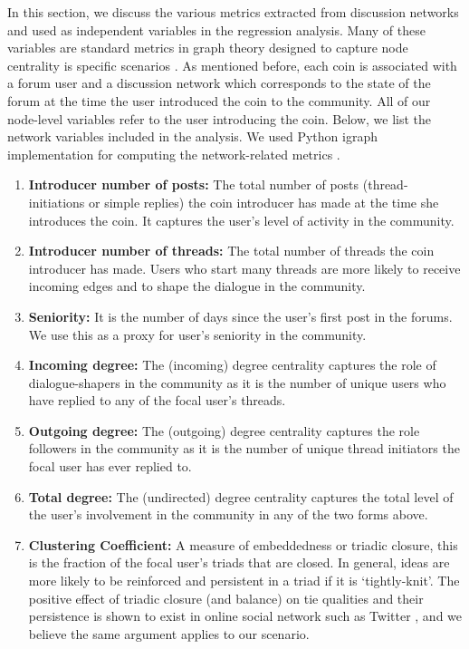 In this section, we discuss the various metrics extracted from discussion networks and used as independent variables in the regression analysis. Many of these variables are standard metrics in graph theory designed to capture node centrality is specific scenarios \cite{KleinbergNetworks}. As mentioned before, each coin is associated with a forum user and a discussion network which corresponds to the state of the forum at the time the user introduced the coin to the community. All of our node-level variables refer to the user introducing the coin. Below, we list the network variables included in the analysis. We used Python igraph implementation for computing the network-related metrics \cite{igraph}.
\begin{enumerate}[topsep=0pt,itemsep=-0.5ex,partopsep=1ex,parsep=1ex]
  \item \textbf{Introducer number of posts:} The total number of posts (thread-initiations or simple replies) the coin introducer has made at the time she introduces the coin. It captures the user's level of activity in the community.
  \item \textbf{Introducer number of threads:} The total number of threads the coin introducer has made. Users who start many threads are more likely to receive incoming edges and to shape the dialogue in the community.
  \item \textbf{Seniority:} It is the number of days since the user's first post in the forums. We use this as a proxy for user's seniority in the community.
  \item \textbf{Incoming degree:} The (incoming) degree centrality captures the role of dialogue-shapers in the community as it is the number of unique users who have replied to any of the focal user's threads.
  \item \textbf{Outgoing degree:} The (outgoing) degree centrality captures the role followers in the community as it is the number of unique thread initiators the focal user has ever replied to. 
  \item \textbf{Total degree:} The (undirected) degree centrality captures the total level of the user's involvement in the community in any of the two forms above.
  \item \textbf{Clustering Coefficient:} A measure of embeddedness or triadic closure, this is the fraction of the focal user's triads that are closed. In general, ideas are more likely to be reinforced and persistent in a triad if it is `tightly-knit'. The positive effect of triadic closure (and balance) on tie qualities and their persistence is shown to exist in online social network such as Twitter \cite{KleinbergBalance}, and we believe the same argument applies to our scenario.

\end{enumerate}
